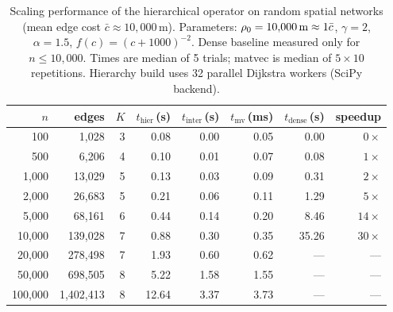 \begin{table}[t]
\centering
\caption{Scaling performance of the hierarchical operator on random
  spatial networks (mean edge cost $\bar{c} \approx 10{,}000$\,m).
  Parameters: $\rho_0 = 10{,}000\text{\,m} \approx 1\bar{c}$,
  $\gamma = 2$, $\alpha = 1.5$, $f(c) = (c+1000)^{-2}$.
  Dense baseline measured only for $n \le 10{,}000$.
  Times are median of 5 trials; matvec is median of $5 \times 10$
  repetitions. Hierarchy build uses 32 parallel Dijkstra workers
  (SciPy backend).}
\label{tab:scaling}
\begin{tabular}{rrrrrrrr}
\toprule
$n$ & edges & $K$ & $t_{\mathrm{hier}}$\,(s)
    & $t_{\mathrm{inter}}$\,(s) & $t_{\mathrm{mv}}$\,(ms)
    & $t_{\mathrm{dense}}$\,(s) & speedup \\
\midrule
       100 &      1{,}028 & 3 &   0.08 &   0.00 &  0.05 &       0.00 & $0\times$ \\
       500 &      6{,}206 & 4 &   0.10 &   0.01 &  0.07 &       0.08 & $1\times$ \\
   1{,}000 &     13{,}029 & 5 &   0.13 &   0.03 &  0.09 &       0.31 & $2\times$ \\
   2{,}000 &     26{,}683 & 5 &   0.21 &   0.06 &  0.11 &       1.29 & $5\times$ \\
   5{,}000 &     68{,}161 & 6 &   0.44 &   0.14 &  0.20 &       8.46 & $14\times$ \\
  10{,}000 &    139{,}028 & 7 &   0.88 &   0.30 &  0.35 &      35.26 & $30\times$ \\
  20{,}000 &    278{,}498 & 7 &   1.93 &   0.60 &  0.62 &        --- & --- \\
  50{,}000 &    698{,}505 & 8 &   5.22 &   1.58 &  1.55 &        --- & --- \\
 100{,}000 & 1{,}402{,}413 & 8 &  12.64 &   3.37 &  3.73 &        --- & --- \\
\bottomrule
\end{tabular}
\end{table}
